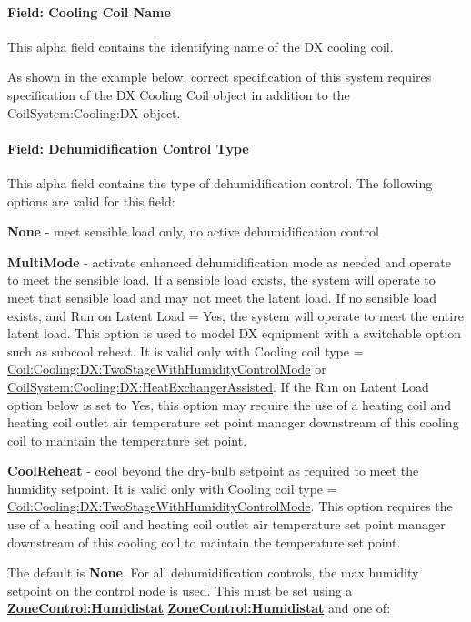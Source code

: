 \paragraph{Field: Cooling Coil Name}\label{field-cooling-coil-name-000}

This alpha field contains the identifying name of the DX cooling coil.

As shown in the example below, correct specification of this system requires specification of the DX Cooling Coil object in addition to the CoilSystem:Cooling:DX object.

\paragraph{Field: Dehumidification Control Type}\label{field-dehumidification-control-type}

This alpha field contains the type of dehumidification control. The following options are valid for this field:

\textbf{None} - meet sensible load only, no active dehumidification control

\textbf{MultiMode} - activate enhanced dehumidification mode as needed and operate to meet the sensible load. If a sensible load exists, the system will operate to meet that sensible load and may not meet the latent load. If no sensible load exists, and Run on Latent Load = Yes, the system will operate to meet the entire latent load. This option is used to model DX equipment with a switchable option such as subcool reheat. It is valid only with Cooling coil type = \hyperref[coilcoolingdxtwostagewithhumiditycontrolmode]{Coil:Cooling:DX:TwoStageWithHumidityControlMode} or \hyperref[coilsystemcoolingdxheatexchangerassisted]{CoilSystem:Cooling:DX:HeatExchangerAssisted}. If the Run on Latent Load option below is set to Yes, this option may require the use of a heating coil and heating coil outlet air temperature set point manager downstream of this cooling coil to maintain the temperature set point.

\textbf{CoolReheat} - cool beyond the dry-bulb setpoint as required to meet the humidity setpoint. It is valid only with Cooling coil type = \hyperref[coilcoolingdxtwostagewithhumiditycontrolmode]{Coil:Cooling:DX:TwoStageWithHumidityControlMode}. This option requires the use of a heating coil and heating coil outlet air temperature set point manager downstream of this cooling coil to maintain the temperature set point.

The default is \textbf{None}. For all dehumidification controls, the max humidity setpoint on the control node is used. This must be set using a \textbf{\hyperref[zonecontrolhumidistat]{ZoneControl:Humidistat}} \textbf{\hyperref[zonecontrolhumidistat]{ZoneControl:Humidistat}} and one of:

